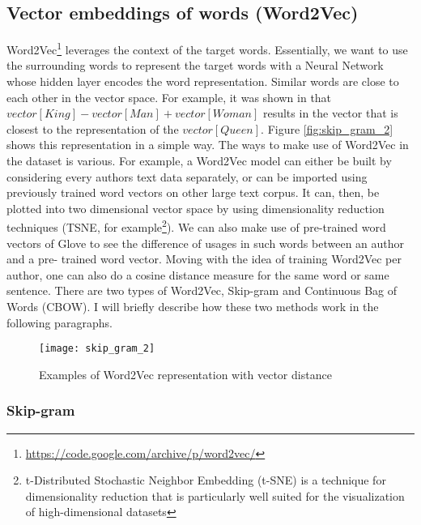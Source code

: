 \subsection{Vector embeddings of words (Word2Vec)}
Word2Vec\footnote{\url{https://code.google.com/archive/p/word2vec/}} leverages the context of the target words. Essentially, we want to use the surrounding words to represent the target words with a Neural Network whose hidden layer encodes the word representation.
Similar words are close
to each other in the vector space. For example, it was shown in \cite{mikolov2013linguistic} that $vector[King] - vector[Man] + vector[Woman]$ results in the vector that is closest to the representation of the $vector[Queen]$.
Figure \ref{fig:skip_gram_2} shows this representation in a simple way.
The ways to make use of Word2Vec in the dataset is various.
For example, a Word2Vec model can either be built by considering every authors
text data separately, or can be imported using previously trained word vectors on
other large text corpus. It can, then, be plotted into two dimensional vector space
by using dimensionality reduction techniques (TSNE, for example\footnote{t-Distributed Stochastic Neighbor Embedding (t-SNE) is a technique for dimensionality reduction that is particularly well suited for the visualization of high-dimensional datasets}). 
We can also make use of pre-trained word vectors of
Glove to see the difference of usages in such words between an author and a pre-
trained word vector.
Moving with the idea of training Word2Vec per author, one can also do a cosine
distance measure for the same word or same sentence.
There are two types of Word2Vec, Skip-gram and Continuous Bag of Words (CBOW). I will briefly describe how these two methods work in the following paragraphs.

\begin{figure}[ht]
	\centering
	\texttt{[image: skip\_gram\_2]}
	\caption[Word2Vec]{Examples of Word2Vec representation with vector distance}
	\label{fig:skipgram}
\end{figure}

\subsubsection{Skip-gram}

